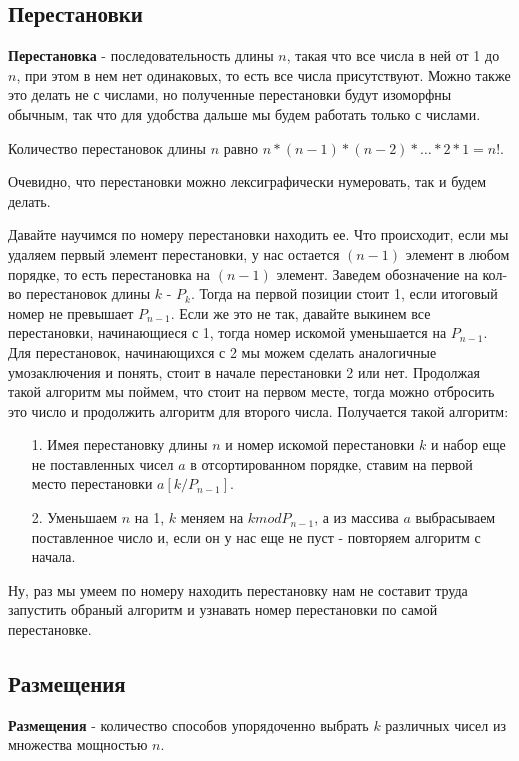\documentclass{article}
\begin{document}
\subsection{Перестановки}
\textbf{Перестановка} - последовательность длины $n$, такая что все числа в ней от 1 до $n$, при этом в нем нет одинаковых, то есть все числа присутствуют. Можно также это делать не с числами, но полученные перестановки будут изоморфны обычным, так что для удобства дальше мы будем работать только с числами.

Количество перестановок длины $n$ равно $n * (n-1)*(n-2)*\dots *2*1 = n!$.

Очевидно, что перестановки можно лексиграфически нумеровать, так и будем делать.

Давайте научимся по номеру перестановки находить ее. Что происходит, если мы удаляем первый элемент перестановки, у нас остается $(n-1)$ элемент в любом порядке, то есть перестановка на $(n-1)$ элемент. Заведем обозначение на кол-во перестановок длины $k$ - $P_k$. Тогда на первой позиции стоит 1, если итоговый номер не превышает $P_{n-1}$. Если же это не так, давайте выкинем все перестановки, начинающиеся с 1, тогда номер искомой уменьшается на $P_{n-1}$. Для перестановок, начинающихся с 2 мы можем сделать аналогичные умозаключения и понять, стоит в начале перестановки 2 или нет. Продолжая такой алгоритм мы поймем, что стоит на первом месте, тогда можно отбросить это число и продолжить алгоритм для второго числа. Получается такой алгоритм:
\begin{enumerate}
    \item [1.] Имея перестановку длины $n$ и номер искомой перестановки $k$ и набор еще не поставленных чисел $a$ в отсортированном порядке, ставим на первой место перестановки $a[k / P_{n - 1}]$.
    \item[2.] Уменьшаем $n$ на 1, $k$ меняем на $k mod P_{n - 1}$, а из массива $a$ выбрасываем поставленное число и, если он у нас еще не пуст - повторяем алгоритм с начала.
\end{enumerate} 

Ну, раз мы умеем по номеру находить перестановку нам не составит труда запустить обраный алгоритм и узнавать номер перестановки по самой перестановке.

\subsection{Размещения}
\textbf{Размещения} - количество способов упорядоченно выбрать $k$ различных чисел из множества мощностью $n$.
\end{document}
